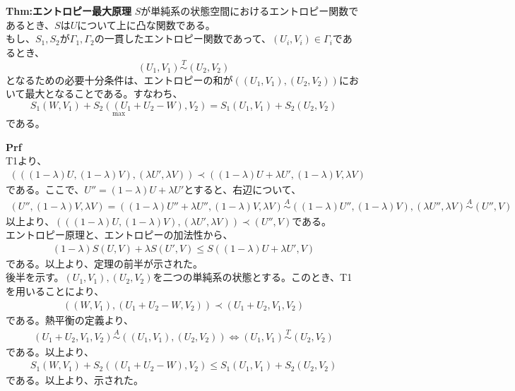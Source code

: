 \documentclass[a4paper,11pt]{jsarticle}
\begin{document}
\begin{itembox}[l]{\textbf{Thm:エントロピー最大原理}}
    $S$が単純系の状態空間におけるエントロピー関数であるとき、$S$は$U$について上に凸な関数である。\\
    もし、$S_1,S_2$が$\Gamma_1,\Gamma_2$の一貫したエントロピー関数であって、$(U_i,V_i)\in \Gamma_i$であるとき、
    \begin{equation}
        (U_1,V_1) \overset{T}{\sim} (U_2,V_2) 
    \end{equation}
    となるための必要十分条件は、エントロピーの和が$((U_1,V_1),(U_2,V_2))$において最大となることである。すなわち、
    \begin{equation}
        \underset{\text{max}}{S_1(W,V_1)+S_2((U_1+U_2-W),V_2)} =S_1(U_1,V_1)+S_2(U_2,V_2)
    \end{equation}
    である。

\end{itembox}
\textbf{Prf}\\
T1より、
\begin{align}
    (((1-\lambda)U,(1-\lambda)V),(\lambda U',\lambda V)) \prec ((1-\lambda)U+\lambda U',(1-\lambda)V,\lambda V)
\end{align}
である。ここで、$U'' = (1-\lambda)U+\lambda U'$とすると、右辺について、
\begin{align}
    (U'',(1-\lambda)V,\lambda V) =((1-\lambda)U''+\lambda U'',(1-\lambda)V,\lambda V) \overset{A}{\sim} ((1-\lambda)U'',(1-\lambda)V),(\lambda U'',\lambda V) \overset{A}{\sim} (U'',V)
\end{align}
以上より、$    (((1-\lambda)U,(1-\lambda)V),(\lambda U',\lambda V)) \prec (U'',V)$である。\\
エントロピー原理と、エントロピーの加法性から、
\begin{align}
    (1-\lambda)S(U,V)+\lambda S(U',V) \leq S((1-\lambda)U+\lambda U',V)
\end{align}
である。以上より、定理の前半が示された。\\
後半を示す。$(U_1,V_1),(U_2,V_2)$を二つの単純系の状態とする。このとき、T1を用いることにより、
\begin{align}
    ((W,V_1),(U_1+U_2-W,V_2)) \prec (U_1+U_2,V_1,V_2)
\end{align}
である。熱平衡の定義より、
\begin{align}
(U_1+U_2,V_1,V_2) \overset{A}{\sim} ((U_1,V_1),(U_2,V_2)) \Leftrightarrow (U_1,V_1) \overset{T}{\sim} (U_2,V_2)
\end{align}
である。以上より、
\begin{align}
    S_1(W,V_1)+S_2((U_1+U_2-W),V_2) \leq S_1(U_1,V_1)+S_2(U_2,V_2)
\end{align}
である。以上より、示された。\hfill\qedsymbol\\
\end{document}
